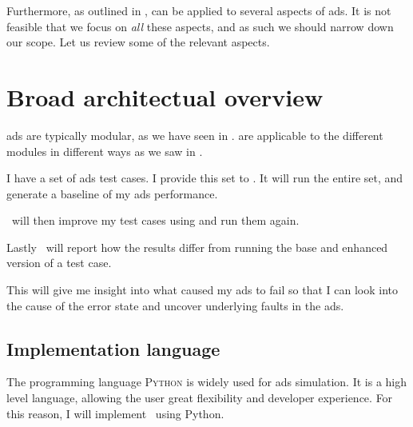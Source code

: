 Furthermore, as outlined in \citeauthor{LLM4AD},  can be applied to several aspects
of \acrlong{ads}. It is not feasible that we focus on \textit{all} these aspects, and as such we
should narrow down our scope. Let us review some of the relevant aspects.


\section{Broad architectual overview}


\acrlong{ads} are typically modular, as we have seen in .
 are applicable to the different modules in different ways as we saw in
.

\begin{tcolorbox}[colback=gray!5!white,colframe=gray!75!black,title=User history
        of using \hefe]\label{user-history}
    I have a set of \acrfull{ads} test cases. I provide this set to \hefe. It will run the entire
    set, and generate a baseline of my \acrshort{ads} performance.

    \hefe~will then improve my test cases using  and run them again.

    Lastly \hefe~will report how the results differ from running the base and enhanced version of a
    test case.

    This will give me insight into what caused my \acrshort{ads} to fail so that I can look into the
    cause of the error state and uncover underlying faults in the \acrlong{ads}.

\end{tcolorbox}


\subsection{Implementation language}

The programming language \textsc{Python} is widely used for \acrfull{ads} simulation. It is a high
level language, allowing the user great flexibility and developer experience. For this reason, I will
implement \hefe~using Python.

